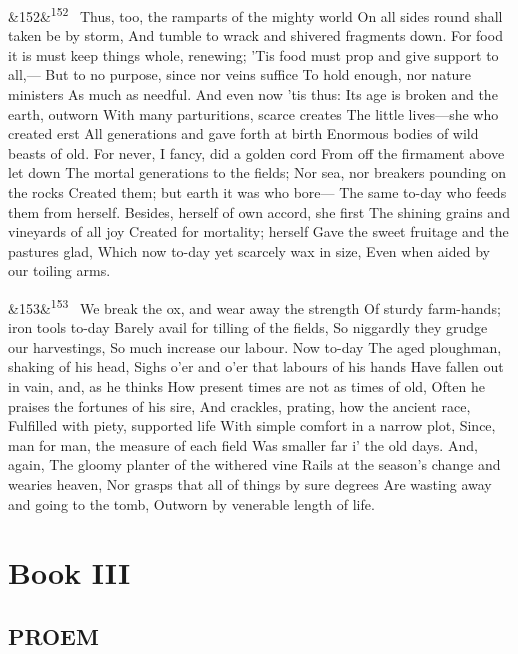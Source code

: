 \documentclass[12pt]{article}
\newcommand{\para}[1][]{\par\noindent\ifx&#1&\else\textsuperscript{\footnotesize #1}~\fi}
\begin{document}
\para[152] Thus, too, the ramparts of the mighty world On all sides round shall taken be by storm, And tumble to wrack and shivered fragments down. For food it is must keep things whole, renewing; 'Tis food must prop and give support to all,--- But to no purpose, since nor veins suffice To hold enough, nor nature ministers As much as needful. And even now 'tis thus: Its age is broken and the earth, outworn With many parturitions, scarce creates The little lives---she who created erst All generations and gave forth at birth Enormous bodies of wild beasts of old. For never, I fancy, did a golden cord From off the firmament above let down The mortal generations to the fields; Nor sea, nor breakers pounding on the rocks Created them; but earth it was who bore--- The same to-day who feeds them from herself. Besides, herself of own accord, she first The shining grains and vineyards of all joy Created for mortality; herself Gave the sweet fruitage and the pastures glad, Which now to-day yet scarcely wax in size, Even when aided by our toiling arms.

\para[153] We break the ox, and wear away the strength Of sturdy farm-hands; iron tools to-day Barely avail for tilling of the fields, So niggardly they grudge our harvestings, So much increase our labour. Now to-day The aged ploughman, shaking of his head, Sighs o'er and o'er that labours of his hands Have fallen out in vain, and, as he thinks How present times are not as times of old, Often he praises the fortunes of his sire, And crackles, prating, how the ancient race, Fulfilled with piety, supported life With simple comfort in a narrow plot, Since, man for man, the measure of each field Was smaller far i' the old days. And, again, The gloomy planter of the withered vine Rails at the season's change and wearies heaven, Nor grasps that all of things by sure degrees Are wasting away and going to the tomb, Outworn by venerable length of life.

\section*{Book III}

\subsection*{PROEM}
\end{document}
